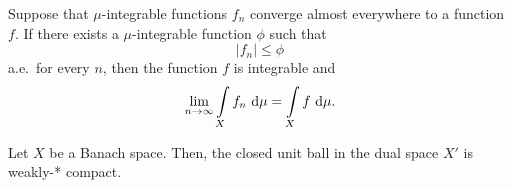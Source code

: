 \begin{theorem}\label{Leb-DomCon}
	Suppose that $\mu$-integrable functions $f_n$ converge almost everywhere to a function $f$. If there exists a $\mu$-integrable function $\phi$ such that
	\[ |f_n| \le \phi \]
	a.e.~for every $n$, then the function $f$ is integrable and
	\[ \lim\limits_{n \rightarrow \infty} \int\limits_X f_n~\text{\normalfont{}d}{\mu} = \int\limits_X f~\text{\normalfont{}d}{\mu}. \]
\end{theorem}

\begin{theorem}\label{Ban-Alao}
	Let $X$ be a Banach space. Then, the closed unit ball in the dual space $X'$ is weakly-* compact.
\end{theorem}